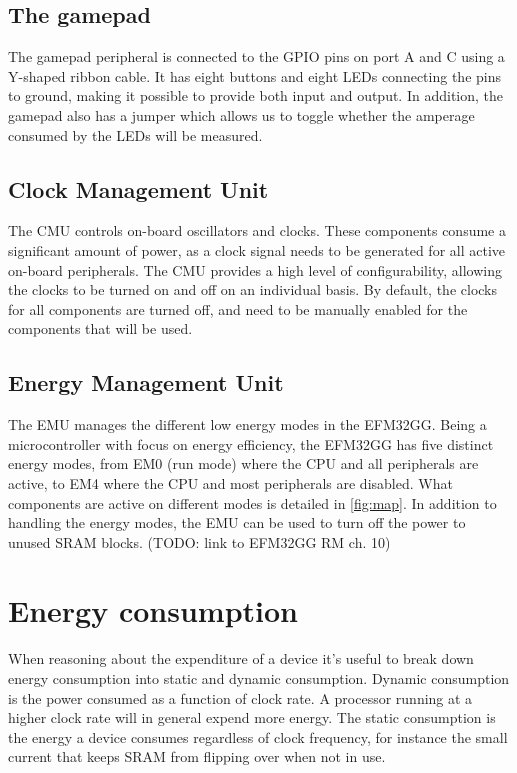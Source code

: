 \subsection{The gamepad}
The gamepad peripheral is connected to the GPIO pins on port A and C using a Y-shaped ribbon cable. It has eight buttons and eight LEDs connecting the pins to ground, making it possible to provide both input and output. In addition, the gamepad also has a jumper which allows us to toggle whether the amperage consumed by the LEDs will be measured.

\subsection{Clock Management Unit}
The CMU controls on-board oscillators and clocks. These components consume a significant amount of power, as a clock signal needs to be generated for all active on-board peripherals. The CMU provides a high level of configurability, allowing the clocks to be turned on and off on an individual basis. By default, the clocks for all components are turned off, and need to be manually enabled for the components that will be used.

\subsection{Energy Management Unit}
The EMU manages the different low energy modes in the EFM32GG. Being a microcontroller with focus on energy efficiency, the EFM32GG has five distinct energy modes, from EM0 (run mode) where the CPU and all peripherals are active, to EM4 where the CPU and most peripherals are disabled. What components are active on different modes is detailed in \ref{fig:map}. In addition to handling the energy modes, the EMU can be used to turn off the power to unused SRAM blocks. (TODO: link to EFM32GG RM ch. 10)


\section{Energy consumption}

When reasoning about the expenditure of a device it’s useful to break down energy consumption into static and dynamic consumption. Dynamic consumption is the power consumed as a function of clock rate. A processor running at a higher clock rate will in general expend more energy. The static consumption is the energy a device consumes regardless of clock frequency, for instance the small current that keeps SRAM from flipping over when not in use.

